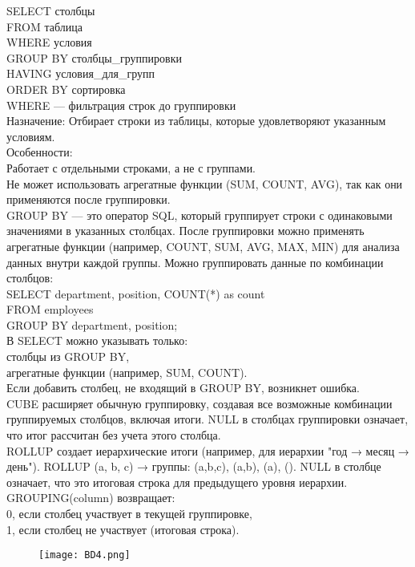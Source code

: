 


\noindent SELECT столбцы \\
FROM таблица \\
WHERE условия \\
GROUP BY столбцы\_группировки\\
HAVING условия\_для\_групп \\
ORDER BY сортировка\ \\

\noindent WHERE — фильтрация строк до группировки \\
Назначение: Отбирает строки из таблицы, которые удовлетворяют указанным условиям. \\
Особенности: \\
Работает с отдельными строками, а не с группами. \\
Не может использовать агрегатные функции (SUM, COUNT, AVG), так как они применяются после группировки. \\

\noindent GROUP BY — это оператор SQL, который группирует строки с одинаковыми значениями в указанных столбцах. После группировки можно применять агрегатные функции (например, COUNT, SUM, AVG, MAX, MIN) для анализа данных внутри каждой группы. Можно группировать данные по комбинации столбцов: \\
SELECT department, position, COUNT(*) as count \\
FROM employees \\
GROUP BY department, position; \\

\noindent В SELECT можно указывать только: \\
столбцы из GROUP BY, \\
агрегатные функции (например, SUM, COUNT). \\
Если добавить столбец, не входящий в GROUP BY, возникнет ошибка. \\

\noindent CUBE расширяет обычную группировку, создавая все возможные комбинации группируемых столбцов, включая итоги. NULL в столбцах группировки означает, что итог рассчитан без учета этого столбца. \\

\noindent ROLLUP создает иерархические итоги (например, для иерархии "год → месяц → день"). ROLLUP (a, b, c) → группы: (a,b,c), (a,b), (a), (). NULL в столбце означает, что это итоговая строка для предыдущего уровня иерархии. \\
GROUPING(column) возвращает: \\
0, если столбец участвует в текущей группировке, \\
1, если столбец не участвует (итоговая строка). \\
\begin{figure}[H]
    \centering
    \texttt{[image: BD4.png]}
\end{figure}

